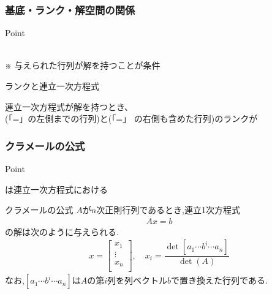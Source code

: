 \documentclass[a4paper]{jsarticle}
\begin{document}
\subsubsection{基底・ランク・解空間の関係}
\begin{itembox}[l]{Point}
    \begin{center}
        \\
        ※ 与えられた行列が解を持つことが条件\\
    \end{center}
\end{itembox}
\begin{itembox}[l]{ランクと連立一次方程式}
    \begin{center}
        連立一次方程式が解を持つとき、\\
        (「=」の左側までの行列)と(「=」 の右側も含めた行列)のランクが
    \end{center}
\end{itembox}
\subsubsection{クラメールの公式}
\begin{itembox}[l]{Point}
    \begin{center}
        は連立一次方程式における
    \end{center}
\end{itembox}
\begin{itembox}[l]{クラメールの公式}
    $A$が$n$次正則行列であるとき,連立1次方程式
    \begin{eqnarray*}
        Ax=b
    \end{eqnarray*}
    の解は次のように与えられる.
    \begin{eqnarray*}
        x=
        \begin{bmatrix}
            x_1    \\
            \vdots \\
            x_n    \\
        \end{bmatrix}
        , \quad
        x_i=\dfrac{\det \left[a_1\cdots b^i\cdots a_n\right]}{\det \left(A\right)}
    \end{eqnarray*}
    なお,$\left[a_1\cdots b^i\cdots a_n\right]$は$A$の第$i$列を列ベクトル$b$で置き換えた行列である.
\end{itembox}
\end{document}
